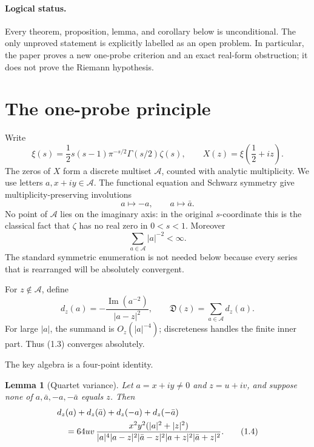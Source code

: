 \documentclass[11pt]{article}
\newtheorem{lemma}[theorem]{Lemma}
\theoremstyle{definition}
\theoremstyle{remark}
\newcommand{\cA}{\mathcal A}
\newcommand{\Ima}{\operatorname{Im}}
\begin{document}
\paragraph{Logical status.}
Every theorem, proposition, lemma, and corollary below is unconditional.  The only unproved
statement is explicitly labelled as an open problem.  In particular, the paper proves a new
one-probe criterion and an exact real-form obstruction; it does not prove the Riemann hypothesis.

\section{The one-probe principle}

Write
\[
 \xi(s)=\frac12s(s-1)\pi^{-s/2}\Gamma(s/2)\zeta(s),
 \qquad
 X(z)=\xi\!\left(\frac12+iz\right).
\]
The zeros of $X$ form a discrete multiset $\cA$, counted with analytic multiplicity.  We use
letters $a,x+iy\in\cA$.  The functional equation and Schwarz symmetry give multiplicity-preserving
involutions
\begin{equation}
 a\longmapsto-a,
 \qquad
 a\longmapsto\bar a.                                      \tag{1.1}
\end{equation}
No point of $\cA$ lies on the imaginary axis: in the original $s$-coordinate this is the
classical fact that $\zeta$ has no real zero in $0<s<1$.  Moreover
\begin{equation}
 \sum_{a\in\cA}|a|^{-2}<\infty.                            \tag{1.2}
\end{equation}
The standard symmetric enumeration is not needed below because every series that is rearranged
will be absolutely convergent.

For $z\notin\cA$, define
\begin{equation}
 d_z(a)=-\frac{\Ima(a^{-2})}{|a-z|^2},
 \qquad
 \mathfrak D(z)=\sum_{a\in\cA}d_z(a).                    \tag{1.3}
\end{equation}
For large $|a|$, the summand is $O_z(|a|^{-4})$; discreteness handles the finite inner part.
Thus (1.3) converges absolutely.

The key algebra is a four-point identity.

\begin{lemma}[Quartet variance]
\label{lem:quartet}
Let $a=x+iy\ne0$ and $z=u+iv$, and suppose none of
$a,\bar a,-a,-\bar a$ equals $z$.  Then
\begin{align}
 &d_z(a)+d_z(\bar a)+d_z(-a)+d_z(-\bar a) \notag\\
 &\quad=64uv\,
 \frac{x^2y^2(|a|^2+|z|^2)}
 {|a|^4|a-z|^2|\bar a-z|^2|a+z|^2|\bar a+z|^2}.          \tag{1.4}
\end{align}
\end{lemma}
\end{document}
